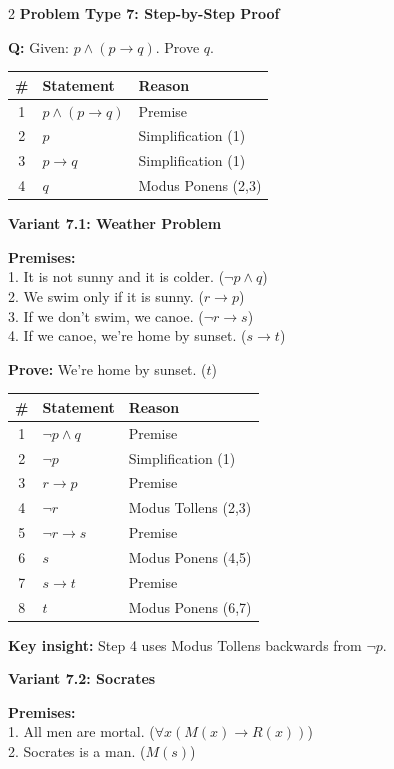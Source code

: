 \documentclass[8pt,a4paper]{article}
\newenvironment{exbox}[1][]{\vspace{2pt}\noindent\textbf{#1}\par\smallskip}{\vspace{2pt}}
\newenvironment{solbox}{\vspace{2pt}\begin{leftbar}}{\end{leftbar}\vspace{2pt}}
\begin{document}
\begin{multicols}{2}
\begin{exbox}[Problem Type 7: Step-by-Step Proof]
\textbf{Q:} Given: $p \land (p \to q)$. Prove $q$.

\begin{solbox}
\begin{tabular}{c|l|l}
\# & Statement & Reason \\
\hline
1 & $p \land (p \to q)$ & Premise \\
2 & $p$ & Simplification (1) \\
3 & $p \to q$ & Simplification (1) \\
4 & $q$ & Modus Ponens (2,3) \\
\end{tabular}
\end{solbox}
\end{exbox}

\begin{exbox}[Variant 7.1: Weather Problem]
\textbf{Premises:}\\
1. It is not sunny and it is colder. ($\neg p \land q$)\\
2. We swim only if it is sunny. ($r \to p$)\\
3. If we don't swim, we canoe. ($\neg r \to s$)\\
4. If we canoe, we're home by sunset. ($s \to t$)

\textbf{Prove:} We're home by sunset. ($t$)

\begin{solbox}
\begin{tabular}{c|l|l}
\# & Statement & Reason \\
\hline
1 & $\neg p \land q$ & Premise \\
2 & $\neg p$ & Simplification (1) \\
3 & $r \to p$ & Premise \\
4 & $\neg r$ & Modus Tollens (2,3) \\
5 & $\neg r \to s$ & Premise \\
6 & $s$ & Modus Ponens (4,5) \\
7 & $s \to t$ & Premise \\
8 & $t$ & Modus Ponens (6,7) \\
\end{tabular}
\end{solbox}

\textbf{Key insight:} Step 4 uses Modus Tollens backwards from $\neg p$.
\end{exbox}

\begin{exbox}[Variant 7.2: Socrates]
\textbf{Premises:}\\
1. All men are mortal. ($\forall x(M(x) \to R(x))$)\\
2. Socrates is a man. ($M(s)$)


\end{exbox}
\end{multicols}
\end{document}
